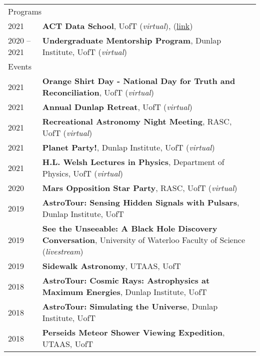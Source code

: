\documentclass[10pt]{res} %
\begin{document}
\begin{resume}
\begin{table}[h!]
\begin{tabularx}{\textwidth}{ @{} p{6.5em} X @{} }
\multicolumn{2}{l}{ \rule{0pt}{3ex} \large \hspace{-12pt} Programs \dotfill \rule[-1.2ex]{0pt}{0pt}} \\
2021 & \textbf{ACT Data School}, UofT (\textit{virtual}),  (\href{https://sites.google.com/view/actdataschool/participants}{link}) \\
2020 -- 2021 & \textbf{Undergraduate Mentorship Program}, Dunlap Institute, UofT (\textit{virtual}) \\

\multicolumn{2}{l}{ \rule{0pt}{3ex} \large \hspace{-12pt} Events \dotfill \rule[-1.2ex]{0pt}{0pt}} \\ 
2021 & \textbf{Orange Shirt Day - National Day for Truth and Reconciliation}, UofT (\textit{virtual}) \\
2021 & \textbf{Annual Dunlap Retreat}, UofT (\textit{virtual}) \\
2021 & \textbf{Recreational Astronomy Night Meeting}, RASC, UofT (\textit{virtual}) \\
2021 & \textbf{Planet Party!}, Dunlap Institute, UofT (\textit{virtual}) \\
2021 & \textbf{H.L. Welsh Lectures in Physics}, Department of Physics, UofT (\textit{virtual}) \\
2020 & \textbf{Mars Opposition Star Party}, RASC, UofT (\textit{virtual}) \\
2019 & \textbf{AstroTour: Sensing Hidden Signals with Pulsars}, Dunlap Institute, UofT \\
2019 & \textbf{See the Unseeable: A Black Hole Discovery Conversation}, University of Waterloo Faculty of Science (\textit{livestream}) \\
2019 & \textbf{Sidewalk Astronomy}, UTAAS, UofT \\
2018 & \textbf{AstroTour: Cosmic Rays: Astrophysics at Maximum Energies}, Dunlap Institute, UofT \\
2018 & \textbf{AstroTour: Simulating the Universe}, Dunlap Institute, UofT \\
2018 & \textbf{Perseids Meteor Shower Viewing Expedition}, UTAAS, UofT 
\end{tabularx}
\end{table}



\end{resume} 
\end{document}
